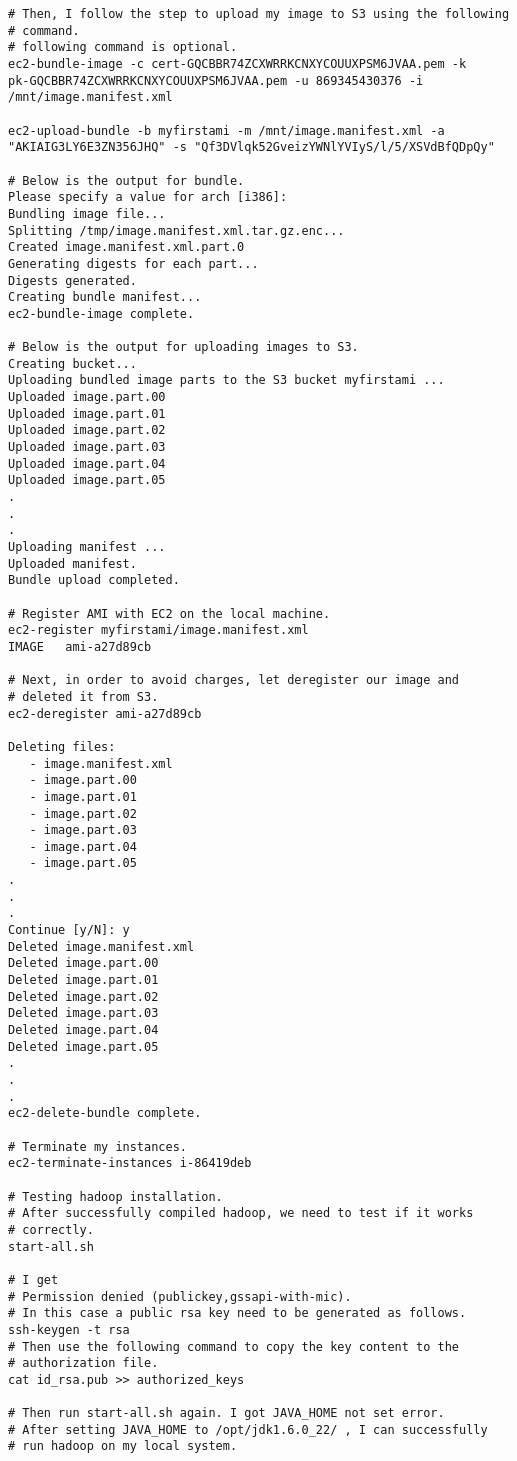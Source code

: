 \documentclass{article}
\begin{document}
\begin{verbatim}
# Then, I follow the step to upload my image to S3 using the following
# command.
# following command is optional. 
ec2-bundle-image -c cert-GQCBBR74ZCXWRRKCNXYCOUUXPSM6JVAA.pem -k
pk-GQCBBR74ZCXWRRKCNXYCOUUXPSM6JVAA.pem -u 869345430376 -i
/mnt/image.manifest.xml 

ec2-upload-bundle -b myfirstami -m /mnt/image.manifest.xml -a
"AKIAIG3LY6E3ZN356JHQ" -s "Qf3DVlqk52GveizYWNlYVIyS/l/5/XSVdBfQDpQy"

# Below is the output for bundle. 
Please specify a value for arch [i386]: 
Bundling image file...
Splitting /tmp/image.manifest.xml.tar.gz.enc...
Created image.manifest.xml.part.0
Generating digests for each part...
Digests generated.
Creating bundle manifest...
ec2-bundle-image complete.

# Below is the output for uploading images to S3. 
Creating bucket...
Uploading bundled image parts to the S3 bucket myfirstami ...
Uploaded image.part.00
Uploaded image.part.01
Uploaded image.part.02
Uploaded image.part.03
Uploaded image.part.04
Uploaded image.part.05
.
.
.
Uploading manifest ...
Uploaded manifest.
Bundle upload completed.

# Register AMI with EC2 on the local machine. 
ec2-register myfirstami/image.manifest.xml
IMAGE	ami-a27d89cb

# Next, in order to avoid charges, let deregister our image and
# deleted it from S3. 
ec2-deregister ami-a27d89cb

Deleting files:
   - image.manifest.xml
   - image.part.00
   - image.part.01
   - image.part.02
   - image.part.03
   - image.part.04
   - image.part.05
.
.
.
Continue [y/N]: y
Deleted image.manifest.xml
Deleted image.part.00
Deleted image.part.01
Deleted image.part.02
Deleted image.part.03
Deleted image.part.04
Deleted image.part.05
.
.
.
ec2-delete-bundle complete.

# Terminate my instances. 
ec2-terminate-instances i-86419deb

# Testing hadoop installation. 
# After successfully compiled hadoop, we need to test if it works
# correctly. 
start-all.sh 

# I get
# Permission denied (publickey,gssapi-with-mic).
# In this case a public rsa key need to be generated as follows. 
ssh-keygen -t rsa
# Then use the following command to copy the key content to the
# authorization file.  
cat id_rsa.pub >> authorized_keys

# Then run start-all.sh again. I got JAVA_HOME not set error.
# After setting JAVA_HOME to /opt/jdk1.6.0_22/ , I can successfully
# run hadoop on my local system. 
\end{verbatim}
 
\end{document}

